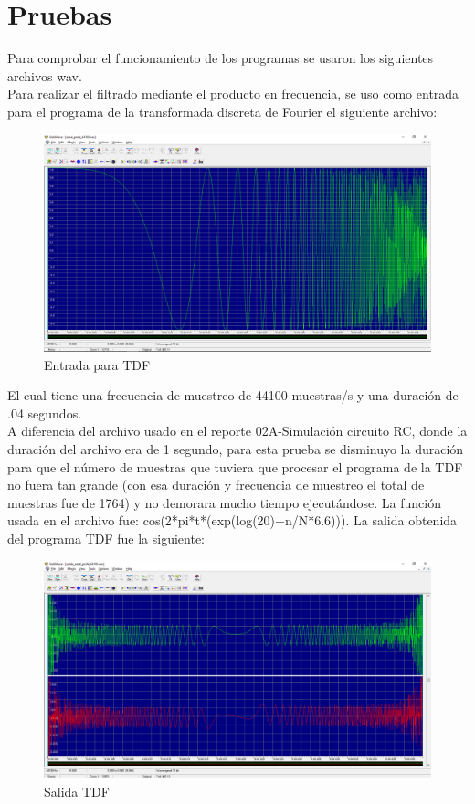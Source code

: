 \section{Pruebas}
Para comprobar el funcionamiento de los programas se usaron los siguientes archivos wav.\\
Para realizar el filtrado mediante el producto en frecuencia, se uso como entrada para el programa de la transformada discreta de Fourier el siguiente archivo:
\begin{figure}[H]
	\centering
	\includegraphics[scale=.35]{img/entrada.png}
	\caption{Entrada para TDF}
	\label{fig:prueba1}		
\end{figure}
El cual tiene una frecuencia de muestreo de 44100 muestras/s y una duración de .04 segundos.\\ A diferencia del archivo usado en el reporte 02A-Simulación circuito RC, donde la duración del archivo era de 1 segundo, para esta prueba se disminuyo la duración para que el número de muestras que tuviera que procesar el programa de la TDF no fuera tan grande (con esa duración y frecuencia de muestreo el total de muestras fue de 1764) y no demorara mucho tiempo ejecutándose. La función usada en el archivo fue: cos(2*pi*t*(exp(log(20)+n/N*6.6))).\newpage
La salida obtenida del programa TDF fue la siguiente:
\begin{figure}[H]
	\centering
	\includegraphics[scale=.3]{img/salidaTDF.png}
	\caption{Salida TDF}
	\label{fig:prueba2}		
\end{figure}

